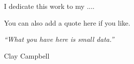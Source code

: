 \documentclass[main.tex]{subfiles}
\begin{document}
\newpage

I dedicate this work to my ....

You can also add a quote here if you like.

\begin{flushleft}
\textit{``What you have here is small data.''}
\end{flushleft}

\begin{flushright}
Clay Campbell
\end{flushright}
\end{document}
